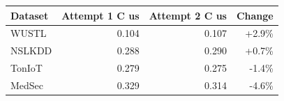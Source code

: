 \begin{tabular}{lrrr}
\toprule
Dataset & Attempt 1 C us & Attempt 2 C us & Change \\
\midrule
WUSTL & 0.104 & 0.107 & +2.9\% \\
NSLKDD & 0.288 & 0.290 & +0.7\% \\
TonIoT & 0.279 & 0.275 & -1.4\% \\
MedSec & 0.329 & 0.314 & -4.6\% \\
\bottomrule
\end{tabular}
